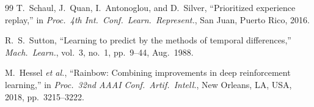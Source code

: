 \documentclass[conference]{IEEEtran}
\begin{document}
\begin{thebibliography}{99}
T.~Schaul, J.~Quan, I.~Antonoglou, and D.~Silver,
``Prioritized experience replay,''
in \emph{Proc.\ 4th Int.\ Conf.\ Learn.\ Represent.}, San Juan, Puerto
Rico, 2016.

R.~S.~Sutton,
``Learning to predict by the methods of temporal differences,''
\emph{Mach.\ Learn.}, vol.~3, no.~1, pp.~9--44, Aug.\ 1988.

M.~Hessel \emph{et al.},
``Rainbow: Combining improvements in deep reinforcement learning,''
in \emph{Proc.\ 32nd AAAI Conf.\ Artif.\ Intell.}, New Orleans, LA, USA,
2018, pp.~3215--3222.

\end{thebibliography}
\end{document}
